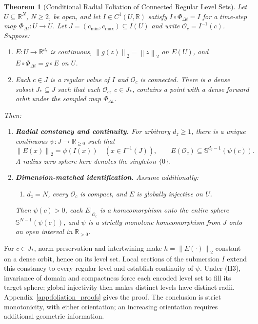 \documentclass[10pt]{article}
\newtheorem{theorem}{Theorem}
\theoremstyle{definition}
\theoremstyle{remark}
\newcommand{\R}{\mathbb{R}}
\newcommand{\Sp}{\mathbb{S}}
\newcommand{\norm}[1]{\left\lVert #1 \right\rVert}
\begin{document}
\begin{theorem}[Conditional Radial Foliation of Connected Regular Level Sets]
\label{thm:radial_foliation}
Let $U\subseteq\R^N$, $N\ge2$, be open, and let $I\in C^1(U,\R)$ satisfy $I\circ\Phi_{\Delta t}=I$ for a time-step map $\Phi_{\Delta t}:U\to U$. Let $J=(c_{\min},c_{\max})\subseteq I(U)$ and write $\mathcal O_c=I^{-1}(c)$. Suppose:
\begin{enumerate}
    \item[\textbf{(H1)}] $E:U\to\R^{d_z}$ is continuous, $\norm{g(z)}_2=\norm z_2$ on $E(U)$, and $E\circ\Phi_{\Delta t}=g\circ E$ on $U$.
    \item[\textbf{(H2)}] Each $c\in J$ is a regular value of $I$ and $\mathcal O_c$ is connected. There is a dense subset $J_*\subseteq J$ such that each $\mathcal O_c$, $c\in J_*$, contains a point with a dense forward orbit under the \emph{sampled map} $\Phi_{\Delta t}$.
\end{enumerate}
Then:
\begin{enumerate}
    \item[\textbf{(a)}] \textbf{Radial constancy and continuity.} For arbitrary $d_z\ge1$, there is a unique continuous $\psi:J\to\R_{\ge0}$ such that
    \begin{equation}
        \norm{E(x)}_2=\psi(I(x))\quad(x\in I^{-1}(J)),\qquad
        E(\mathcal O_c)\subseteq\Sp^{d_z-1}(\psi(c)).
        \label{eq:level_set_constancy}
    \end{equation}
    A radius-zero sphere here denotes the singleton $\{0\}$.
    \item[\textbf{(b)}] \textbf{Dimension-matched identification.} Assume additionally:
    \begin{enumerate}
        \item[\textbf{(H3)}] $d_z=N$, every $\mathcal O_c$ is compact, and $E$ is globally injective on $U$.
    \end{enumerate}
    Then $\psi(c)>0$, each $E|_{\mathcal O_c}$ is a homeomorphism onto the entire sphere $\Sp^{N-1}(\psi(c))$, and $\psi$ is a strictly monotone homeomorphism from $J$ onto an open interval in $\R_{>0}$.
\end{enumerate}
\end{theorem}

For $c\in J_*$, norm preservation and intertwining make $h=\norm{E(\cdot)}_2$ constant on a dense orbit, hence on its level set. Local sections of the submersion $I$ extend this constancy to every regular level and establish continuity of $\psi$. Under (H3), invariance of domain and compactness force each encoded level set to fill its target sphere; global injectivity then makes distinct levels have distinct radii. Appendix~\ref{app:foliation_proofs} gives the proof. The conclusion is strict monotonicity, with either orientation; an increasing orientation requires additional geometric information.
\end{document}
